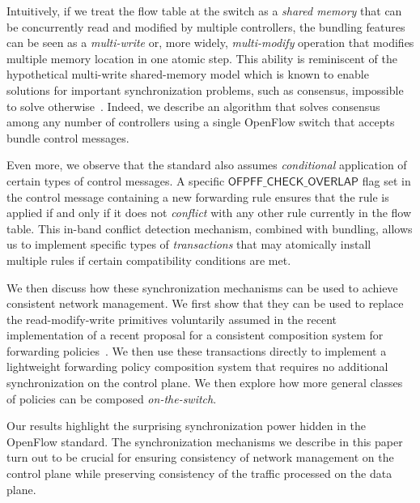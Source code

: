 \documentclass[conference]{sigcomm-alternate}
\begin{document}
Intuitively, if we treat the flow table at the switch as a \emph{shared memory}
that can be concurrently read and modified by multiple controllers, 
the bundling features can be seen as a \emph{multi-write} or, more
widely, \emph{multi-modify} operation that modifies
multiple memory location in one atomic step.
This ability is reminiscent of the hypothetical multi-write
shared-memory model which is known to enable solutions for important
synchronization problems, such as consensus, impossible to solve
otherwise~\cite{multi-objects}. 
Indeed, we describe an algorithm that solves consensus among any
number of controllers using a single OpenFlow switch that accepts
bundle control messages. 
   
Even more, we observe that the standard also assumes \emph{conditional} application of
certain types of control messages. A specific $\textsf{OFPFF\_CHECK\_OVERLAP}$ flag
set in the control message containing a new forwarding rule ensures
that the rule is applied if and only if it does not \emph{conflict}
with any other rule currently in the flow table.  
This in-band conflict detection mechanism, combined with bundling,
allows us to implement specific types of \emph{transactions} that may
atomically install multiple rules if certain compatibility conditions
are met. 

We then discuss how these synchronization mechanisms can be used to
achieve consistent network management. 
We first show that they can be used to replace the read-modify-write
primitives voluntarily assumed in the recent implementation of a
recent proposal for a consistent composition system for forwarding policies~\cite{cpc}.  
We then use these transactions directly to implement a lightweight
forwarding policy composition system that requires no additional
synchronization on the control plane.     
We then explore how more general classes of policies can be composed
\emph{on-the-switch}. 

Our results highlight the surprising synchronization power hidden in the
OpenFlow standard. The synchronization mechanisms we describe in this
paper turn out to be crucial for ensuring consistency of network
management on the control plane while preserving consistency of the
traffic processed on the data plane. 


 
\end{document}
